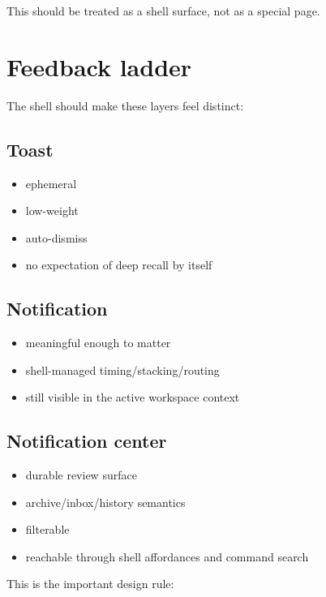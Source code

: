 This should be treated as a shell surface, not as a special page.

\section{Feedback ladder}\label{record-053-feedback-ladder}

The shell should make these layers feel distinct:

\subsection{Toast}\label{record-053-toast}

\begin{itemize}
\tightlist
\item
  ephemeral
\item
  low-weight
\item
  auto-dismiss
\item
  no expectation of deep recall by itself
\end{itemize}

\subsection{Notification}\label{record-053-notification}

\begin{itemize}
\tightlist
\item
  meaningful enough to matter
\item
  shell-managed timing/stacking/routing
\item
  still visible in the active workspace context
\end{itemize}

\subsection{Notification center}\label{record-053-notification-center}

\begin{itemize}
\tightlist
\item
  durable review surface
\item
  archive/inbox/history semantics
\item
  filterable
\item
  reachable through shell affordances and command search
\end{itemize}

This is the important design rule:


